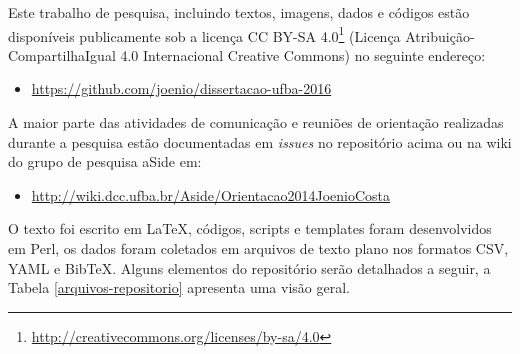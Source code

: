 \label{reprodutibilidade-do-estudo}

Este trabalho de pesquisa, incluindo textos, imagens, dados e códigos estão
disponíveis publicamente sob a
licença CC BY-SA 4.0\footnote{\url{http://creativecommons.org/licenses/by-sa/4.0}}
(Licença Atribuição-CompartilhaIgual 4.0 Internacional Creative Commons)
no seguinte endereço:

\begin{itemize}
  \item \url{https://github.com/joenio/dissertacao-ufba-2016}
\end{itemize}

A maior parte das atividades de comunicação e reuniões de orientação realizadas
durante a pesquisa estão documentadas em {\it issues} no repositório acima ou na wiki do
grupo de pesquisa aSide em:

\begin{itemize}
  \item \url{http://wiki.dcc.ufba.br/Aside/Orientacao2014JoenioCosta}
\end{itemize}

O texto foi escrito em \LaTeX, códigos, scripts e templates foram desenvolvidos
em Perl, os dados foram coletados em arquivos de texto plano nos formatos CSV,
YAML e BibTeX. Alguns elementos do repositório serão detalhados a seguir, a Tabela
\ref{arquivos-repositorio} apresenta uma visão geral.

